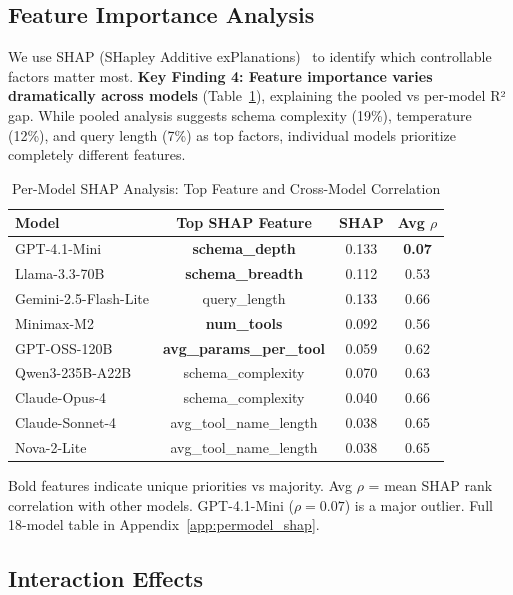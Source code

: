 \documentclass[sigconf,anonymous,review]{acmart}
\begin{document}
\subsection{Feature Importance Analysis}
\label{sec:shap}

We use SHAP (SHapley Additive exPlanations)~\cite{lundberg2017shap} to identify which controllable factors matter most. \textbf{Key Finding 4: Feature importance varies dramatically across models} (Table~\ref{tab:permodel_shap}), explaining the pooled vs per-model R² gap. While pooled analysis suggests schema complexity (19\%), temperature (12\%), and query length (7\%) as top factors, individual models prioritize completely different features.

\begin{table}[t]
\centering
\caption{Per-Model SHAP Analysis: Top Feature and Cross-Model Correlation}
\label{tab:permodel_shap}
\small
\begin{tabular}{@{}lccc@{}}
\toprule
\textbf{Model} & \textbf{Top SHAP Feature} & \textbf{SHAP} & \textbf{Avg $\rho$} \\
\midrule
GPT-4.1-Mini & \textbf{schema\_depth} & 0.133 & \textbf{0.07} \\
Llama-3.3-70B & \textbf{schema\_breadth} & 0.112 & 0.53 \\
Gemini-2.5-Flash-Lite & query\_length & 0.133 & 0.66 \\
Minimax-M2 & \textbf{num\_tools} & 0.092 & 0.56 \\
GPT-OSS-120B & \textbf{avg\_params\_per\_tool} & 0.059 & 0.62 \\
Qwen3-235B-A22B & schema\_complexity & 0.070 & 0.63 \\
Claude-Opus-4 & schema\_complexity & 0.040 & 0.66 \\
Claude-Sonnet-4 & avg\_tool\_name\_length & 0.038 & 0.65 \\
Nova-2-Lite & avg\_tool\_name\_length & 0.038 & 0.65 \\
\bottomrule
\end{tabular}
\vspace{0.3em}

\raggedright\footnotesize Bold features indicate unique priorities vs majority. Avg $\rho$ = mean SHAP rank correlation with other models. GPT-4.1-Mini ($\rho=0.07$) is a major outlier. Full 18-model table in Appendix~\ref{app:permodel_shap}.
\end{table}

\subsection{Interaction Effects}
\label{sec:interactions}
\end{document}
